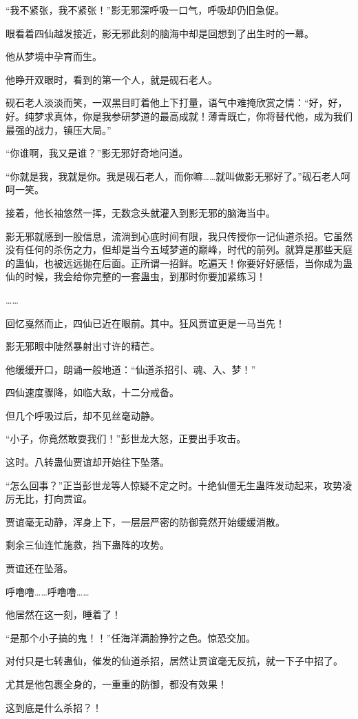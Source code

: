 \begin{this_body}
“我不紧张，我不紧张！”影无邪深呼吸一口气，呼吸却仍旧急促。

眼看着四仙越发接近，影无邪此刻的脑海中却是回想到了出生时的一幕。

他从梦境中孕育而生。

他睁开双眼时，看到的第一个人，就是砚石老人。

砚石老人淡淡而笑，一双黑目盯着他上下打量，语气中难掩欣赏之情：“好，好，好。纯梦求真体，你是我参研梦道的最高成就！薄青既亡，你将替代他，成为我们最强的战力，镇压大局。”

“你谁啊，我又是谁？”影无邪好奇地问道。

“你就是我，我就是你。我是砚石老人，而你嘛……就叫做影无邪好了。”砚石老人呵呵一笑。

接着，他长袖悠然一挥，无数念头就灌入到影无邪的脑海当中。

影无邪就感到一股信息，流淌到心底时间有限，我只传授你一记仙道杀招。它虽然没有任何的杀伤之力，但却是当今五域梦道的巅峰，时代的前列。就算是那些天庭的蛊仙，也被远远抛在后面。正所谓一招鲜。吃遍天！你要好好感悟，当你成为蛊仙的时候，我会给你完整的一套蛊虫，到那时你要加紧练习！

……

回忆戛然而止，四仙已近在眼前。其中。狂风贾谊更是一马当先！

影无邪眼中陡然暴射出寸许的精芒。

他缓缓开口，朗诵一般地道：“仙道杀招引、魂、入、梦！”

四仙速度骤降，如临大敌，十二分戒备。

但几个呼吸过后，却不见丝毫动静。

“小子，你竟然敢耍我们！”彭世龙大怒，正要出手攻击。

这时。八转蛊仙贾谊却开始往下坠落。

“怎么回事？”正当彭世龙等人惊疑不定之时。十绝仙僵无生蛊阵发动起来，攻势凌厉无比，打向贾谊。

贾谊毫无动静，浑身上下，一层层严密的防御竟然开始缓缓消散。

剩余三仙连忙施救，挡下蛊阵的攻势。

贾谊还在坠落。

呼噜噜……呼噜噜……

他居然在这一刻，睡着了！

“是那个小子搞的鬼！！”任海洋满脸狰狞之色。惊恐交加。

对付只是七转蛊仙，催发的仙道杀招，居然让贾谊毫无反抗，就一下子中招了。

尤其是他包裹全身的，一重重的防御，都没有效果！

这到底是什么杀招？！


\end{this_body}
